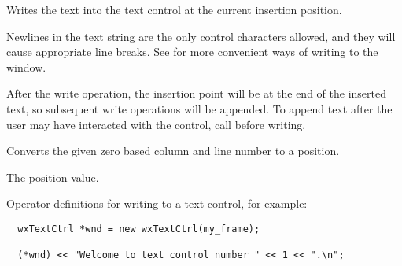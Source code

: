 Writes the text into the text control at the current insertion position. 




Newlines in the text string
are the only control characters allowed, and they will cause appropriate
line breaks.  See  for more convenient ways of writing to the window.

After the write operation, the insertion point will be at the end of the inserted text, so subsequent write operations will be appended. To append text after the user may have interacted with the control, call  before writing.

\label{wxtextctrlxytoposition}


Converts the given zero based column and line number to a position.





The position value.

\label{wxtextctrlinsert}







Operator definitions for writing to a text control, for example:

\begin{verbatim}
  wxTextCtrl *wnd = new wxTextCtrl(my_frame);

  (*wnd) << "Welcome to text control number " << 1 << ".\n";
\end{verbatim}


